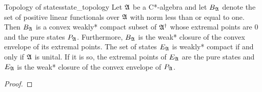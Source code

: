 \begin{theorem}{Topology of states}{state_topology}
    Let \(\mathfrak{A}\) be a C*-algebra and let \(B_{\mathfrak{A}}\) denote the set of positive linear functionals over \(\mathfrak{A}\) with norm less than or equal to one. Then \(B_{\mathfrak{A}}\) is a convex weakly* compact subset of \(\mathfrak{A}^\dag\) whose extremal points are \(0\) and the pure states \(P_{\mathfrak{A}}\). Furthermore, \(B_{\mathfrak{A}}\) is the weak* closure of the convex envelope of its extremal points. The set of states \(E_{\mathfrak{A}}\) is weakly* compact if and only if \(\mathfrak{A}\) is unital. If it is so, the extremal points of \(E_{\mathfrak{A}}\) are the pure states and \(E_{\mathfrak{A}}\) is the weak* closure of the convex envelope of \(P_{\mathfrak{A}}\).
\end{theorem}
\begin{proof}

\end{proof}
